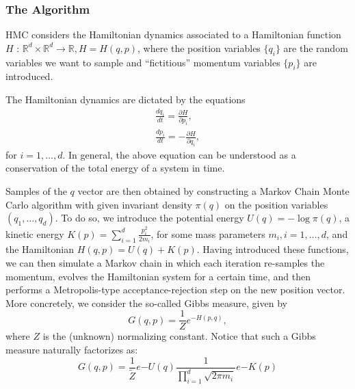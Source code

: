 \documentclass[a4paper, 12pt,oneside]{article}
\begin{document}
			\subsubsection{The Algorithm}
			HMC considers the Hamiltonian dynamics associated to a Hamiltonian function $H$ : $\mathbb{R}^d \times \mathbb{R}^d \rightarrow \mathbb{R}, H=H(q, p)$, where the position variables $\{q_i\}$ are the random variables we want to sample and ``fictitious'' momentum variables $\{p_i\}$ are introduced. 
			
			The Hamiltonian dynamics are dictated by the equations
			\begin{gather}
			\frac{d q_i}{d t} =\frac{\partial H}{\partial p_i}, \\
			\frac{d p_i}{d t} =-\frac{\partial H}{\partial q_i},
			\end{gather}
			for $i=1, \ldots, d$. In general, the above equation can be understood as a conservation of the total energy of a system in time.
			
			Samples of the $q$ vector are then obtained by constructing a Markov Chain Monte Carlo algorithm with given invariant density $\pi(q)$ on the position variables $\left(q_1, \ldots, q_d\right)$. To do so, we introduce the potential energy $U(q)=-\log \pi(q)$, a kinetic energy $K(p)=\sum_{i=1}^d \frac{p_i^2}{2 m_i}$, for some mass parameters $m_i, i=1, \ldots, d$, and the Hamiltonian $H(q, p)=U(q)+K(p)$. Having introduced these functions, we can then simulate a Markov chain in which each iteration re-samples the momentum, evolves the Hamiltonian system for a certain time, and then performs a Metropolis-type acceptance-rejection step on the new position vector. More concretely, we consider the so-called Gibbs measure, given by
			$$
			G(q, p)=\frac{1}{Z} e^{-H(p, q)},
			$$
			where $Z$ is the (unknown) normalizing constant. Notice that such a Gibbs measure naturally factorizes as:
			$$
			G(q, p)=\frac{1}{\tilde{Z}} e{-U(q)} \frac{1}{\prod_{i=1}^d \sqrt{2 \pi m_i}} e{-K(p)}
			$$
			
\end{document}
